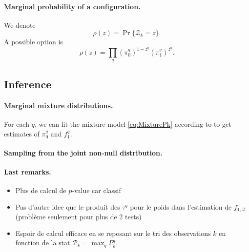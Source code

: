\documentclass[a4paper, 11pt]{article}
\newcommand{\Pcal}{\mathcal{P}}
\newcommand{\Zcal}{\mathcal{Z}}
\begin{document}
\paragraph{Marginal probability of a configuration.} We denote
$$
\rho(z) = \Pr\{\Zcal_k = z\}.
$$
A possible option is
$$
\rho(z) = \prod_q (\pi^q_0)^{1-z^q} (\pi^q_1)^{z^q}.
$$

\subsection{Inference}

\paragraph{Marginal mixture distributions.} For each $q$, we can fit the mixture model \eqref{eq:MixturePk} according to \cite{RBD07} to get estimates of $\pi^q_0$ and $f^q_1$.

\paragraph{Sampling from the joint non-null distribution.} 


\paragraph{Last remarks.} 
\begin{itemize}
 \item Plus de calcul de $p$-value car classif
 \item Pas d'autre idee que le produit des $\tau^q$ pour le poids dans l'estimation de $f_{1, \Zcal}$ (problème seulement pour plus de 2 tests)
 \item Espoir de calcul efficace en se reposant sur le tri des observations $k$ en fonction de la stat $\Pcal_k = \max_q P^q_k$.
\end{itemize}

\end{document}
